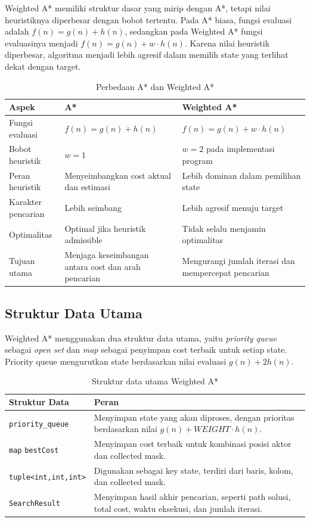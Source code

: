 Weighted A* memiliki struktur dasar yang mirip dengan A*, tetapi nilai heuristiknya diperbesar dengan bobot tertentu. 
Pada A* biasa, fungsi evaluasi adalah $f(n)=g(n)+h(n)$, sedangkan pada Weighted A* fungsi evaluasinya menjadi $f(n)=g(n)+w \cdot h(n)$. 
Karena nilai heuristik diperbesar, algoritma menjadi lebih agresif dalam memilih state yang terlihat dekat dengan target.

\begin{table}[H]
	\centering
	\caption{Perbedaan A* dan Weighted A*}
	\begin{tabular}{|p{4cm}|p{5cm}|p{5cm}|}
		\hline
		\rowcolor{purple!15}
		\textbf{Aspek} & \textbf{A*} & \textbf{Weighted A*} \\
		\hline
		Fungsi evaluasi & $f(n)=g(n)+h(n)$ & $f(n)=g(n)+w \cdot h(n)$ \\
		\hline
		Bobot heuristik & $w=1$ & $w=2$ pada implementasi program \\
		\hline
		Peran heuristik & Menyeimbangkan cost aktual dan estimasi & Lebih dominan dalam pemilihan state \\
		\hline
		Karakter pencarian & Lebih seimbang & Lebih agresif menuju target \\
		\hline
		Optimalitas & Optimal jika heuristik admissible & Tidak selalu menjamin optimalitas \\
		\hline
		Tujuan utama & Menjaga keseimbangan antara cost dan arah pencarian & Mengurangi jumlah iterasi dan mempercepat pencarian \\
		\hline
	\end{tabular}
\end{table}

\subsection{Struktur Data Utama}

Weighted A* menggunakan dua struktur data utama, yaitu \textit{priority queue} sebagai \textit{open set} dan \textit{map} sebagai penyimpan cost terbaik untuk setiap state. 
Priority queue mengurutkan state berdasarkan nilai evaluasi $g(n)+2h(n)$.

\begin{table}[H]
	\centering
	\caption{Struktur data utama Weighted A*}
	\begin{tabular}{|p{4cm}|p{10cm}|}
		\hline
		\rowcolor{purple!15}
		\textbf{Struktur Data} & \textbf{Peran} \\
		\hline
		\texttt{priority\_queue} & Menyimpan state yang akan diproses, dengan prioritas berdasarkan nilai $g(n)+WEIGHT \cdot h(n)$. \\
		\hline
		\texttt{map} \texttt{bestCost} & Menyimpan cost terbaik untuk kombinasi posisi aktor dan collected mask. \\
		\hline
		\texttt{tuple<int,int,int>} & Digunakan sebagai key state, terdiri dari baris, kolom, dan collected mask. \\
		\hline
		\texttt{SearchResult} & Menyimpan hasil akhir pencarian, seperti path solusi, total cost, waktu eksekusi, dan jumlah iterasi. \\
		\hline
	\end{tabular}
\end{table}

